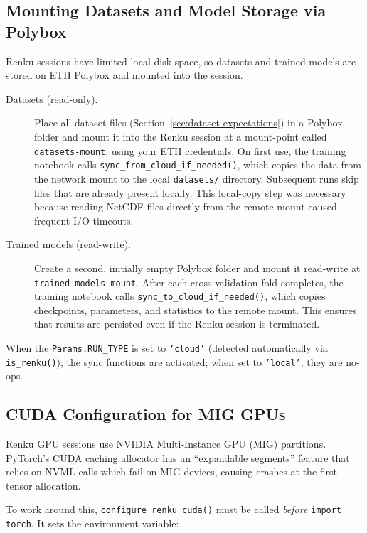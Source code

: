\subsection{Mounting Datasets and Model Storage via Polybox}

Renku sessions have limited local disk space, so datasets and trained models are stored on ETH Polybox and mounted into the session.

\begin{description}
  \item[Datasets (read-only).] Place all dataset files (Section~\ref{sec:dataset-expectations}) in a Polybox folder and mount it into the Renku session at a mount-point called \texttt{datasets-mount}, using your ETH credentials.
  On first use, the training notebook calls \newline \texttt{sync\_from\_cloud\_if\_needed()}, which copies the data from the network mount to the local \texttt{datasets/} directory.
  Subsequent runs skip files that are already present locally.
  This local-copy step was necessary because reading NetCDF files directly from the remote mount caused frequent I/O timeouts.

  \item[Trained models (read-write).] Create a second, initially empty Polybox folder and mount it read-write at \texttt{trained-models-mount}.
  After each cross-validation fold completes, the training notebook calls \texttt{sync\_to\_cloud\_if\_needed()}, which copies checkpoints, parameters, and statistics to the remote mount.
  This ensures that results are persisted even if the Renku session is terminated.
\end{description}

When the \texttt{Params.RUN\_TYPE} is set to \texttt{'cloud'} (detected automatically via \texttt{is\_renku()}), the sync functions are activated; when set to \texttt{'local'}, they are no-ops.

\subsection{CUDA Configuration for MIG GPUs}

Renku GPU sessions use NVIDIA Multi-Instance GPU (MIG) partitions.
PyTorch's CUDA caching allocator has an ``expandable segments'' feature that relies on NVML calls which fail on MIG devices, causing crashes at the first tensor allocation.

To work around this, \texttt{configure\_renku\_cuda()} must be called \emph{before} \texttt{import torch}.
It sets the environment variable:

